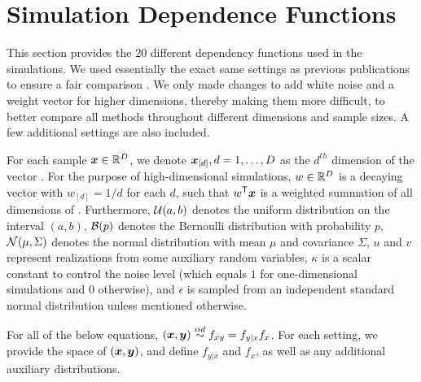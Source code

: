 \documentclass[11pt]{article}
\begin{document}
\clearpage


\section{Simulation Dependence Functions}
\label{appen:function}

This section provides the $20$ different dependency functions used in the simulations.  We used essentially the exact same settings as previous publications to ensure a fair comparison \cite{SzekelyRizzoBakirov2007, SimonTibshirani2012, SimonTibshirani2012, GorfineHellerHeller2012}.  We only made changes to add white noise and a weight vector for higher dimensions, thereby making them more difficult, to better compare all methods throughout different dimensions and sample sizes. A few additional settings are also included.

For each sample $\boldsymbol{x} \in \mathbb{R}^{D}$, we denote $\boldsymbol{x}_{[d]}, d=1,\ldots,D$ as the $d^{th}$ dimension of the vector \mbx. For the purpose of high-dimensional simulations, $w \in \mathbb{R}^{D}$ is a decaying vector with $w_{[d]}=1/d$ for each $d$, such that $w^{\mathsf{T}} \boldsymbol{x}$ is a weighted summation of all dimensions of \mbx. 
Furthermore, $\mathcal{U}(a,b)$ denotes the uniform distribution on the interval $(a,b)$, $\mathcal{B}(p)$ denotes the Bernoulli distribution with probability $p$, $\mathcal{N}(\mu,{\Sigma})$ denotes the normal distribution with mean ${\mu}$ and covariance ${\Sigma}$, 
$u$ and $v$ represent realizations from some auxiliary random variables, $\kappa$ is a scalar constant to control the noise level (which equals $1$ for one-dimensional simulations and $0$ otherwise), and $\epsilon$ is sampled from an independent standard normal distribution unless mentioned otherwise.

For all of the below equations, $(\boldsymbol{x},\boldsymbol{y}) \overset{iid}{\sim} f_{xy} = f_{y|x} f_x$. For each setting, we provide the space of $(\boldsymbol{x},\boldsymbol{y})$, and define $f_{y|x}$ and $f_x$, as well as any additional auxiliary distributions.
\end{document}
